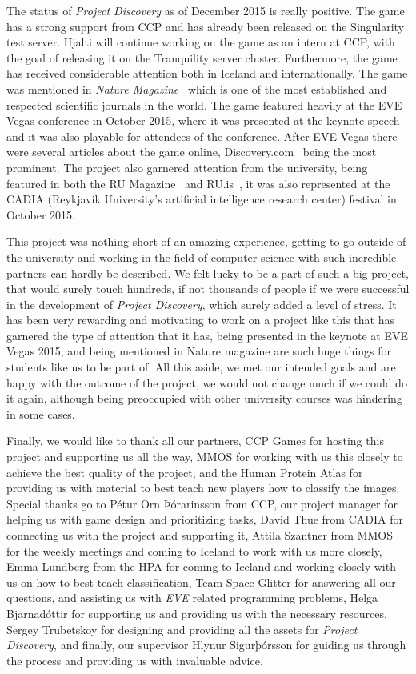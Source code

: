 The status of \emph{Project Discovery} as of December 2015 is really positive. The game has a strong support from CCP and has already been released on the Singularity test server. Hjalti will continue working on the game as an intern at CCP, with the goal of releasing it on the Tranquility server cluster. Furthermore, the game has received considerable attention both in Iceland and internationally. The game was mentioned in \emph{Nature Magazine}~\cite{nature} which is one of the most established and respected scientific journals in the world. The game featured heavily at the EVE Vegas conference in October 2015, where it was presented at the keynote speech and it was also playable for attendees of the conference. After EVE Vegas there were several articles about the game online, Discovery.com~\cite{discovery} being the most prominent. The project also garnered attention from the university, being featured in both the RU Magazine~\cite{rumag} and RU.is~\cite{ruis}, it was also represented at the CADIA (Reykjavík University's artificial intelligence research center) festival in October 2015. 

This project was nothing short of an amazing experience, getting to go outside of the university and working in the field of computer science with such incredible partners can hardly be described. We felt lucky to be a part of such a big project, that would surely touch hundreds, if not thousands of people if we were successful in the development of \emph{Project Discovery}, which surely added a level of stress. It has been very rewarding and motivating to work on a project like this that has garnered the type of attention that it has, being presented in the keynote at EVE Vegas 2015, and being mentioned in Nature magazine are such huge things for students like us to be part of. All this aside, we met our intended goals and are happy with the outcome of the project, we would not change much if we could do it again, although being preoccupied with other university courses was hindering in some cases.

Finally, we would like to thank all our partners, CCP Games for hosting this project and supporting us all the way, MMOS for working with us this closely to achieve the best quality of the project, and the Human Protein Atlas for providing us with material to best teach new players how to classify the images. Special thanks go to Pétur Örn Þórarinsson from CCP, our project manager for helping us with game design and prioritizing tasks, David Thue from CADIA for connecting us with the project and supporting it, Attila Szantner from MMOS for the weekly meetings and coming to Iceland to work with us more closely, Emma Lundberg from the HPA for coming to Iceland and working closely with us on how to best teach classification, Team Space Glitter for answering all our questions, and assisting us with \emph{EVE} related programming problems, Helga Bjarnadóttir for supporting us and providing us with the necessary resources, Sergey Trubetskoy for designing and providing all the assets for \emph{Project Discovery}, and finally, our supervisor Hlynur Sigurþórsson for guiding us through the process and providing us with invaluable advice. 

